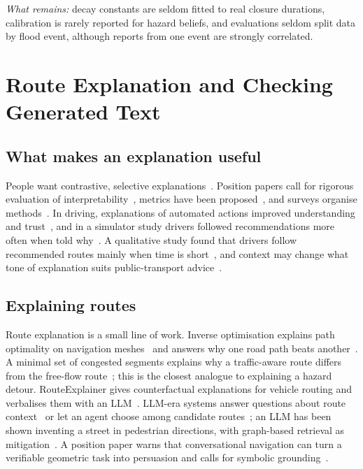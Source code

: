 \documentclass[journal]{IEEEtran}
\begin{document}
\emph{What remains:} decay constants are seldom fitted to real closure durations, calibration is rarely reported for hazard beliefs, and evaluations seldom split data by flood event, although reports from one event are strongly correlated.

\section{Route Explanation and Checking Generated Text}\label{sec:xai}
\subsection{What makes an explanation useful}
People want contrastive, selective explanations~\cite{miller2019explanation}. Position papers call for rigorous evaluation of interpretability~\cite{doshivelez2017rigorous,lipton2018mythos}, metrics have been proposed~\cite{hoffman2018metrics}, and surveys organise methods~\cite{guidotti2018survey,adadi2018xai,gilpin2018explaining}. In driving, explanations of automated actions improved understanding and trust~\cite{koo2015car}, and in a simulator study drivers followed recommendations more often when told why~\cite{thill2018adherence}. A qualitative study found that drivers follow recommended routes mainly when time is short~\cite{samson2019connected}, and context may change what tone of explanation suits public-transport advice~\cite{vredenborg2026tone}.

\subsection{Explaining routes}
Route explanation is a small line of work. Inverse optimisation explains path optimality on navigation meshes~\cite{brandao2021pathplan} and answers why one road path beats another~\cite{alsheeb2023explainable}. A minimal set of congested segments explains why a traffic-aware route differs from the free-flow route~\cite{schild2025route}; this is the closest analogue to explaining a hazard detour. RouteExplainer gives counterfactual explanations for vehicle routing and verbalises them with an LLM~\cite{kikuta2024routeexplainer}. LLM-era systems answer questions about route context~\cite{hallgarten2025routellm} or let an agent choose among candidate routes~\cite{braun2025pave}; an LLM has been shown inventing a street in pedestrian directions, with graph-based retrieval as mitigation~\cite{moratz2025bilateral}. A position paper warns that conversational navigation can turn a verifiable geometric task into persuasion and calls for symbolic grounding~\cite{ilyankou2026scenic}.
\end{document}
